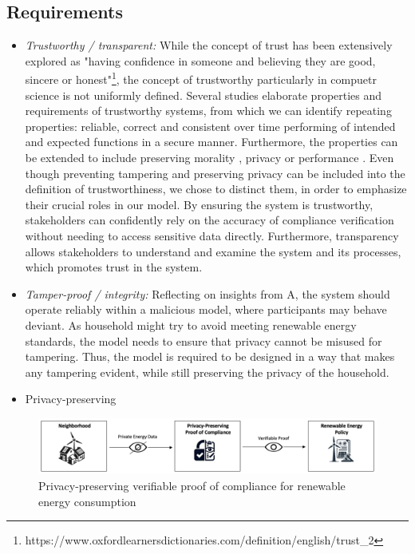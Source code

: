 
\subsection{Requirements}

\begin{itemize}
    \item \textit{Trustworthy / transparent:} While the concept of trust has been extensively explored as "having confidence in someone and believing they are good, sincere or honest"\footnote{https://www.oxfordlearnersdictionaries.com/definition/english/trust\_2}, the concept of trustworthy particularly in compuetr science is not uniformly defined. Several studies \cite{turstworthy_morality, turstworthy_privacy, trustworthy_perfomance} elaborate properties and requirements of trustworthy systems, from which we can identify repeating properties: reliable, correct and consistent over time performing of intended and expected functions in a secure manner. Furthermore, the properties can be extended to include preserving morality \cite{turstworthy_morality}, privacy \cite{turstworthy_privacy} or performance \cite{trustworthy_perfomance}. Even though preventing tampering and preserving privacy can be included into the definition of trustworthiness, we chose to distinct them, in order to emphasize their crucial roles in our model. By ensuring the system is trustworthy, stakeholders can confidently rely on the accuracy of compliance verification without needing to access sensitive data directly. Furthermore, transparency allows stakeholders to understand and examine the system and its processes, which promotes trust in the system.
    \item \textit{Tamper-proof / integrity:} Reflecting on insights from A, the system should operate reliably within a malicious model, where participants may behave deviant. As household might try to avoid meeting renewable energy standards, the model needs to ensure that privacy cannot be misused for tampering. Thus, the model is required to be designed in a way that makes any tampering evident, while still preserving the privacy of the household.
    \item Privacy-preserving 
    
\end{itemize}


\begin{figure}[htb]
  \centering
  \includegraphics[width=1.5\columnwidth]{img/intro.png}
  \caption{Privacy-preserving verifiable proof of compliance for renewable energy consumption}\label{fig:intro}
\end{figure}